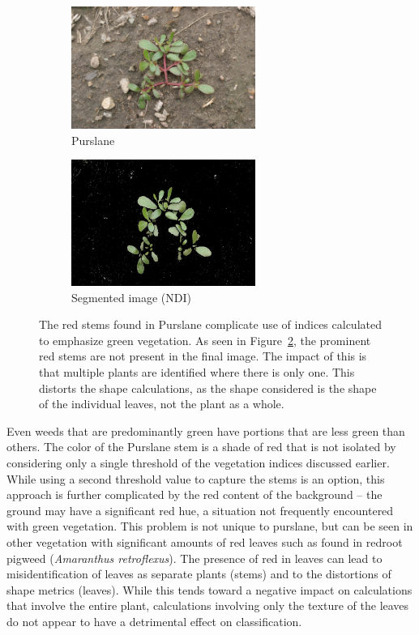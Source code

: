 \documentclass[letterpaper, notitlepage]{report}
\begin{document}
\begin{figure}[h!]
	\centering
	\begin{subfigure}[h]{.40\textwidth}
		\centering
		\includegraphics[width=6cm]{./figures/purslane.png}
		\caption{Purslane}
		\label{fig:purslane}
	\end{subfigure}
	\begin{subfigure}[h]{.40\textwidth}
		\centering
		\includegraphics[width=6cm]{./figures/purslane-segmented.jpg}
		\caption{Segmented image (NDI)}
		\label{fig:purslane-segmented}
	\end{subfigure}
	\caption[Color problems complicate segmentation]{The red stems found in Purslane complicate use of indices calculated to emphasize green vegetation. As seen in Figure~\ref{fig:purslane-segmented}, the prominent red stems are not present in the final image. The impact of this is that multiple plants are identified where there is only one. This distorts the shape calculations, as the shape considered is the shape of the individual leaves, not the plant as a whole.}
	\label{fig:segmentation-problem}
\end{figure}

Even weeds that are predominantly green have portions that are less green than others. The color of the Purslane stem is a shade of red that is not isolated by considering only a single threshold of the vegetation indices discussed earlier. While using a second threshold value to capture the stems is an option, this approach is further complicated by the red content of the background -- the ground may have a significant red hue, a situation not frequently encountered with green vegetation. This problem is not unique to purslane, but can be seen in other vegetation with significant amounts of red leaves such as found in redroot pigweed (\textit{Amaranthus retroflexus}).  The presence of red in leaves can lead to misidentification of leaves as separate plants (stems) and to the distortions of shape metrics (leaves). While this tends toward a negative impact on calculations that involve the entire plant, calculations involving only the texture of the leaves do not appear to have a detrimental effect on classification.
\end{document}
